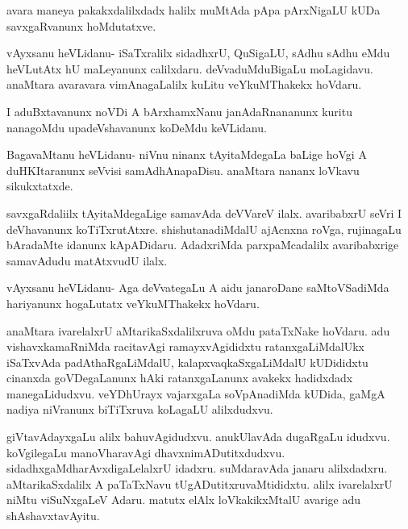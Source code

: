 \documentclass{article}
\begin{document}
\begin{mng}%
avara maneya pakakxdalilxdadx halilx muMtAda pApa pArxNigaLU
kUDa savxgaRvanunx hoMdutatxve.
\end{mng}

\begin{mng}%
vAyxsanu heVLidanu- iSaTxralilx sidadhxrU, QuSigaLU, sAdhu
sAdhu eMdu heVLutAtx hU maLeyanunx calilxdaru. deVvaduMduBigaLu
moLagidavu. anaMtara avaravara vimAnagaLalilx kuLitu veYkuMThakekx hoVdaru.
\end{mng}

\begin{mng}%
I aduBxtavanunx noVDi A bArxhamxNanu janAdaRnananunx kuritu
nanagoMdu upadeVshavanunx koDeMdu keVLidanu.
\end{mng}

\begin{mng}%
BagavaMtanu heVLidanu- niVnu ninanx tAyitaMdegaLa baLige hoVgi
A duHKItaranunx seVvisi samAdhAnapaDisu. anaMtara nananx loVkavu
sikukxtatxde.
\end{mng}

\begin{mng}%
savxgaRdaliilx tAyitaMdegaLige samavAda deVVareV ilalx. avaribabxrU
seVri I deVhavanunx koTiTxrutAtxre. shishutanadiMdalU ajAcnxna roVga,
rujinagaLu bAradaMte idanunx kApADidaru. AdadxriMda parxpaMcadalilx
avaribabxrige samavAdudu matAtxvudU ilalx.
\end{mng}

\begin{mng}%
vAyxsanu heVLidanu- Aga deVvategaLu A aidu janaroDane saMtoVSadiMda
hariyanunx hogaLutatx veYkuMThakekx hoVdaru.
\end{mng}

\begin{mng}%
anaMtara ivarelalxrU aMtarikaSxdalilxruva oMdu pataTxNake
hoVdaru. adu vishavxkamaRniMda racitavAgi ramayxvAgididxtu ratanxgaLiMdalUkx
iSaTxvAda padAthaRgaLiMdalU, kalapxvaqkaSxgaLiMdalU kUDididxtu cinanxda
goVDegaLanunx hAki ratanxgaLanunx avakekx hadidxdadx manegaLidudxvu. veYDhUrayx
vajarxgaLa soVpAnadiMda kUDida, gaMgA nadiya niVranunx biTiTxruva koLagaLU
alilxdudxvu.
\end{mng}

\begin{mng}%
giVtavAdayxgaLu alilx bahuvAgidudxvu. anukUlavAda
dugaRgaLu idudxvu. koVgilegaLu manoVharavAgi dhavxnimADutitxdudxvu.
sidadhxgaMdharAvxdigaLelalxrU idadxru. suMdaravAda janaru alilxdadxru. aMtarikaSxdalilx
A paTaTxNavu tUgADutitxruvaMtididxtu. alilx ivarelalxrU niMtu viSuNxgaLeV
Adaru. matutx elAlx loVkakikxMtalU avarige adu shAshavxtavAyitu.
\end{mng}
\end{document}
